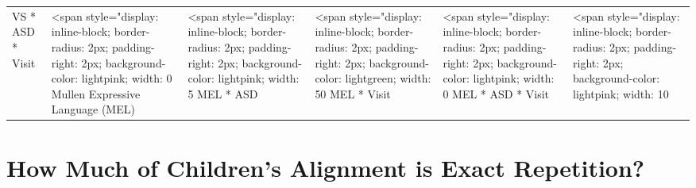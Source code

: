 \documentclass[article,30pt,extrafontsizes]{memoir}
\begin{document}
\begin{adjmulticols*}{3}{}{}
\begin{table}
\begin{tabular}[t]{l|l|l}
\hline
VS * ASD * Visit & <span style="display: inline-block; border-radius: 2px; padding-right: 2px; background-color: lightpink; width: 0%
\hline
Mullen Expressive Language (MEL) & <span style="display: inline-block; border-radius: 2px; padding-right: 2px; background-color: lightpink; width: 5%
\hline
MEL * ASD & <span style="display: inline-block; border-radius: 2px; padding-right: 2px; background-color: lightgreen; width: 50%
\hline
MEL * Visit & <span style="display: inline-block; border-radius: 2px; padding-right: 2px; background-color: lightpink; width: 0%
\hline
MEL * ASD * Visit & <span style="display: inline-block; border-radius: 2px; padding-right: 2px; background-color: lightpink; width: 10%
\hline
\end{tabular}
\end{table}

\section{How Much of Children's Alignment is Exact
Repetition?}\label{how-much-of-childrens-alignment-is-exact-repetition}


\end{adjmulticols*}
\end{document}
